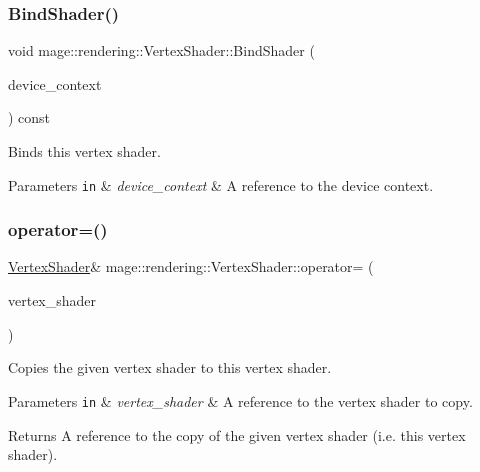 \subsubsection{\texorpdfstring{Bind\+Shader()}{BindShader()}}
{\footnotesize\ttfamily void mage\+::rendering\+::\+Vertex\+Shader\+::\+Bind\+Shader (\begin{DoxyParamCaption}\item[{I\+D3\+D11\+Device\+Context \&}]{device\+\_\+context }\end{DoxyParamCaption}) const\hspace{0.3cm}{\ttfamily [noexcept]}}

Binds this vertex shader.


\begin{DoxyParams}[1]{Parameters}
\mbox{\tt in}  & {\em device\+\_\+context} & A reference to the device context. \\
\hline
\end{DoxyParams}
\hypertarget{classmage_1_1rendering_1_1_vertex_shader_a4dff0bd19a0242300fbde0cc0a4497c4}{}\label{classmage_1_1rendering_1_1_vertex_shader_a4dff0bd19a0242300fbde0cc0a4497c4} 
\subsubsection{\texorpdfstring{operator=()}{operator=()}\hspace{0.1cm}{\footnotesize\ttfamily [1/2]}}
{\footnotesize\ttfamily \hyperlink{classmage_1_1rendering_1_1_vertex_shader}{Vertex\+Shader}\& mage\+::rendering\+::\+Vertex\+Shader\+::operator= (\begin{DoxyParamCaption}\item[{const \hyperlink{classmage_1_1rendering_1_1_vertex_shader}{Vertex\+Shader} \&}]{vertex\+\_\+shader }\end{DoxyParamCaption})\hspace{0.3cm}{\ttfamily [delete]}}

Copies the given vertex shader to this vertex shader.


\begin{DoxyParams}[1]{Parameters}
\mbox{\tt in}  & {\em vertex\+\_\+shader} & A reference to the vertex shader to copy. \\
\hline
\end{DoxyParams}
\begin{DoxyReturn}{Returns}
A reference to the copy of the given vertex shader (i.\+e. this vertex shader). 
\end{DoxyReturn}
\hypertarget{classmage_1_1rendering_1_1_vertex_shader_a2d63073a65a136f2afa898af67eedb8b}{}\label{classmage_1_1rendering_1_1_vertex_shader_a2d63073a65a136f2afa898af67eedb8b} 
